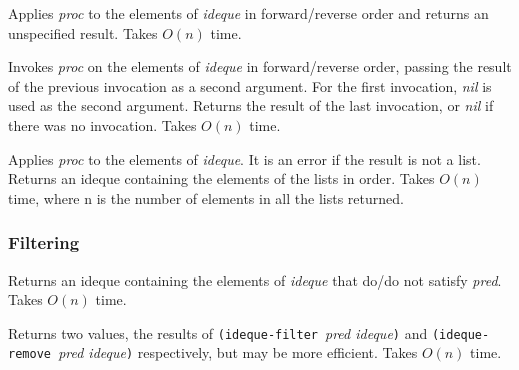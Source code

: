 \begin{entry}{%
  }

  Applies \emph{proc} to the elements of \emph{ideque} in
  forward/reverse order and returns an unspecified result. Takes $O(n)$
  time.
\end{entry}

\begin{entry}{%
  }

  Invokes \emph{proc} on the elements of \emph{ideque} in
  forward/reverse order, passing the result of the previous invocation
  as a second argument. For the first invocation, \emph{nil} is used
  as the second argument. Returns the result of the last invocation,
  or \emph{nil} if there was no invocation. Takes $O(n)$ time.
\end{entry}

\begin{entry}{%
  }

  Applies \emph{proc} to the elements of \emph{ideque}. It is an error
  if the result is not a list. Returns an ideque containing the
  elements of the lists in order. Takes $O(n)$ time, where n is the
  number of elements in all the lists returned.
\end{entry}

\subsubsection{Filtering}

\begin{entry}{%
  }

  Returns an ideque containing the elements of \emph{ideque} that
  do/do not satisfy \emph{pred}. Takes $O(n)$ time.

\end{entry}

\begin{entry}{%
  }

Returns two values, the results of \texttt{(ideque-filter}~\emph{pred
  ideque}\texttt{)} and \texttt{(ideque-remove\ }\emph{pred
  ideque}\texttt{)} respectively, but may be more efficient. Takes
$O(n)$ time.
\end{entry}

